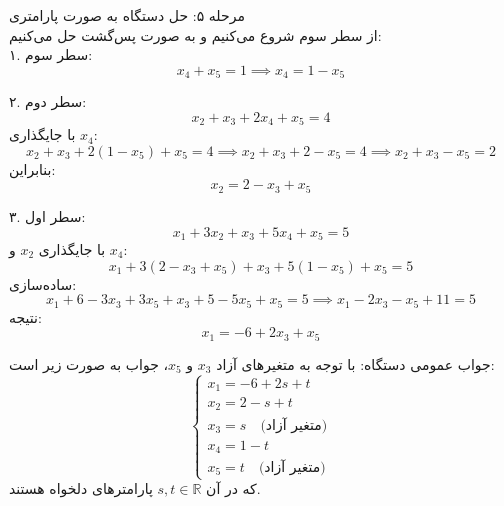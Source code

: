 \begin{example}[]
	
	مرحله ۵: حل دستگاه به صورت پارامتری  \\
	از سطر سوم شروع می‌کنیم و به صورت پس‌گشت حل می‌کنیم:\\
	
	۱. سطر سوم:
	\[
	x_4 + x_5 = 1 \implies x_4 = 1 - x_5
	\]
	
	۲. سطر دوم:
	\[
	x_2 + x_3 + 2x_4 + x_5 = 4
	\]
	با جایگذاری \(x_4\):
	\[
	x_2 + x_3 + 2(1 - x_5) + x_5 = 4 \implies x_2 + x_3 + 2 - x_5 = 4 \implies x_2 + x_3 - x_5 = 2
	\]
	بنابراین:
	\[
	x_2 = 2 - x_3 + x_5
	\]
	
	۳. سطر اول:
	\[
	x_1 + 3x_2 + x_3 + 5x_4 + x_5 = 5
	\]
	با جایگذاری \(x_2\) و \(x_4\):
	\[
	x_1 + 3(2 - x_3 + x_5) + x_3 + 5(1 - x_5) + x_5 = 5
	\]
	ساده‌سازی:
	\[
	x_1 + 6 - 3x_3 + 3x_5 + x_3 + 5 - 5x_5 + x_5 = 5 \implies x_1 - 2x_3 - x_5 + 11 = 5
	\]
	نتیجه:
	\[
	x_1 = -6 + 2x_3 + x_5
	\]
	
	
	 جواب عمومی دستگاه:
	با توجه به متغیرهای آزاد \(x_3\) و \(x_5\)، جواب به صورت زیر است:
	\[
	\begin{cases}
		x_1 = -6 + 2s + t \\
		x_2 = 2 - s + t \\
		x_3 = s \quad \text{(متغیر آزاد)} \\
		x_4 = 1 - t \\
		x_5 = t \quad \text{(متغیر آزاد)}
	\end{cases}
	\]
	که در آن \(s, t \in \mathbb{R}\) پارامترهای دلخواه هستند.
	

\end{example}


